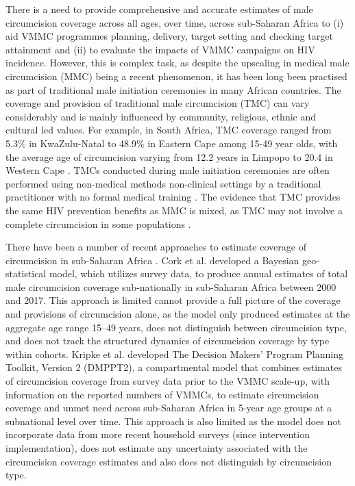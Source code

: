 \documentclass{article}
\begin{document}
There is a need to provide comprehensive  and accurate estimates of male circumcision coverage across all ages, over time, across sub-Saharan Africa to (i) aid VMMC programmes planning, delivery, target setting and checking target attainment and (ii) to evaluate the impacts of VMMC campaigns on HIV incidence. However, this is complex task, as despite the upscaling in medical male circumcision (MMC) being a recent phenomenon, it has been long been practised as part of traditional male initiation ceremonies in many African countries. The coverage and provision of traditional male circumcision (TMC) can vary considerably and is mainly influenced by community, religious, ethnic and cultural led values. For example, in South Africa, TMC coverage ranged from 5.3\% in KwaZulu-Natal to 48.9\% in Eastern Cape among 15-49 year olds, with the average age of circumcision varying from 12.2 years in Limpopo to 20.4 in Western Cape \cite{thomas2024substantial}.  TMCs conducted during male initiation ceremonies are often performed using non-medical methods non-clinical settings by a traditional practitioner with no formal medical training \cite{drain2006male, wilcken2010traditional, weiss2000male}. The evidence that TMC provides the same HIV prevention benefits as MMC is mixed, as TMC may not involve a complete circumcision in some populations \cite{WHOTraditional, shaffer2007protective, bailey2008male}.  

There have been a number of recent approaches to estimate coverage of circumcision in sub-Saharan Africa \cite{cork2020mapping, kripke2016age, kripke2016cost, thomas2024substantial}. Cork et al. \cite{cork2020mapping} developed a Bayesian geo-statistical model, which utilizes survey data, to produce annual estimates of total male circumcision coverage sub-nationally in sub-Saharan Africa between 2000 and 2017. This approach is limited cannot provide a full picture of the coverage and provisions of circumcision alone, as the model only produced estimates at the aggregate age range 15–49 years, does not distinguish between circumcision type, and does not track the structured dynamics of circumcision coverage by type within cohorts. Kripke et al. \cite{kripke2016age, kripke2016cost} developed The Decision Makers’ Program Planning Toolkit, Version 2 (DMPPT2), a compartmental model that combines estimates of circumcision coverage from survey data prior to the VMMC scale-up, with information on the reported numbers of VMMCs, to estimate circumcision coverage and unmet need across sub-Saharan Africa in 5-year age groups at a subnational level over time. This approach is also limited as the model does not incorporate data from more recent household surveys (since intervention implementation), does not estimate any uncertainty associated with the circumcision coverage estimates and also does not distinguish by circumcision type. 
\end{document}
